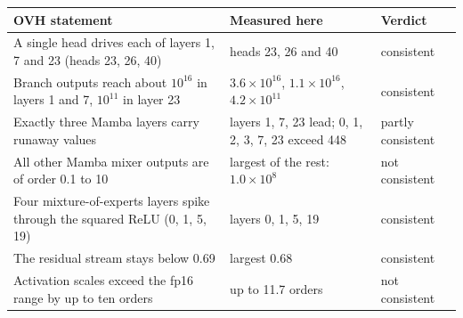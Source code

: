 \begin{tabularx}{\textwidth}{@{}Xp{3.6cm}l@{}}
\toprule
OVH statement & Measured here & Verdict \\
\midrule
A single head drives each of layers 1, 7 and 23 (heads 23, 26, 40) & heads 23, 26 and 40 & consistent \\
Branch outputs reach about $10^{16}$ in layers 1 and 7, $10^{11}$ in layer 23 & $3.6\times 10^{16}$, $1.1\times 10^{16}$, $4.2\times 10^{11}$ & consistent \\
Exactly three Mamba layers carry runaway values & layers 1, 7, 23 lead; 0, 1, 2, 3, 7, 23 exceed 448 & partly consistent \\
All other Mamba mixer outputs are of order 0.1 to 10 & largest of the rest: $1.0\times 10^{8}$ & not consistent \\
Four mixture-of-experts layers spike through the squared ReLU (0, 1, 5, 19) & layers 0, 1, 5, 19 & consistent \\
The residual stream stays below 0.69 & largest 0.68 & consistent \\
Activation scales exceed the fp16 range by up to ten orders & up to 11.7 orders & not consistent \\
\bottomrule
\end{tabularx}
